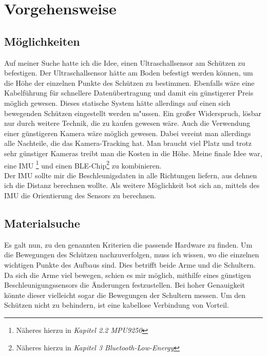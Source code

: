 \chapter{Vorgehensweise}
\section{Möglichkeiten}
Auf meiner Suche hatte ich die Idee, einen Ultraschallsensor am Schützen zu befestigen. Der 
Ultraschallsensor hätte am Boden befestigt werden können, um die Höhe der einzelnen 
Punkte des Schützen zu bestimmen. Ebenfalls wäre eine Kabelführung für schnellere 
Datenübertragung und damit ein günstigerer Preis möglich gewesen. Dieses statische System
hätte allerdings auf einen sich bewegenden Schützen eingestellt werden m"ussen. Ein großer Widerspruch,
lösbar nur durch weitere Technik, die zu kaufen gewesen wäre.
Auch die Verwendung einer günstigeren Kamera wäre möglich gewesen. Dabei vereint man 
allerdings alle Nachteile, die das Kamera-Tracking hat. Man braucht viel Platz und trotz sehr 
günstiger Kameras treibt man die Kosten in die Höhe.
Meine finale Idee war, eine IMU \footnote{Näheres hierzu in \textit{Kapitel 2.2 MPU9250}} und einen 
BLE-Chip\footnote{Näheres hierzu in \textit{Kapitel 3 Bluetooth-Low-Energy}} zu kombinieren. \\
Der IMU sollte mir die Beschleunigsdaten in alle Richtungen liefern, aus dehnen ich die Distanz berechnen wollte.
Als weitere Möglichkeit bot sich an, mittels des IMU die Orientierung des Sensors zu berechnen.


%

\section{Materialsuche}
Es galt nun, zu den genannten Kriterien die passende Hardware zu finden. Um die Bewegungen des 
Schützen nachzuverfolgen, muss ich wissen, wo die einzelnen wichtigen Punkte des Aufbaus 
sind. Dies betrifft beide Arme und die Schultern. Da sich die Arme viel bewegen, schien es mir 
möglich, mithilfe eines günstigen Beschleunigungssensors die Änderungen festzustellen. Bei 
hoher Genauigkeit könnte dieser vielleicht sogar die Bewegungen der Schultern messen.
Um den Schützen nicht zu behindern, ist eine kabellose Verbindung von Vorteil.

